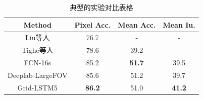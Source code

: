 \begin{table}[h] %
    \centering
    \caption{典型的实验对比表格}
    \begin{tabular}{*{4}{c}}
        \toprule
        Method                                & Pixel Acc.    & Mean Acc.     & Mean Iu.      \\
        \midrule
        Liu等人\cite{liu2011sift}             & 76.7          & -             & -             \\
        Tighe等人\cite{tighe2013finding}      & 78.6          & 39.2          & -             \\
        FCN-16s\cite{long2015fully}           & 85.2          & \textbf{51.7} & 39.5          \\
        Deeplab-LargeFOV\cite{chen14semantic} & 85.6          & 51.2          & 39.7          \\
        \midrule
        Grid-LSTM5                            & \textbf{86.2} & 51.0          & \textbf{41.2} \\
        \bottomrule
    \end{tabular}
    \label{tab:siftflow}
\end{table}

